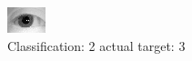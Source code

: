 \begin{figure}[h!]
\begin{center}
\includegraphics[width=0.60\columnwidth]{figures/ID1205_class_2_target_3.png}
\end{center}
\caption{ Classification: 2 actual target: 3}
\label{fig:ID1205_class_2_target_3}
\end{figure}
